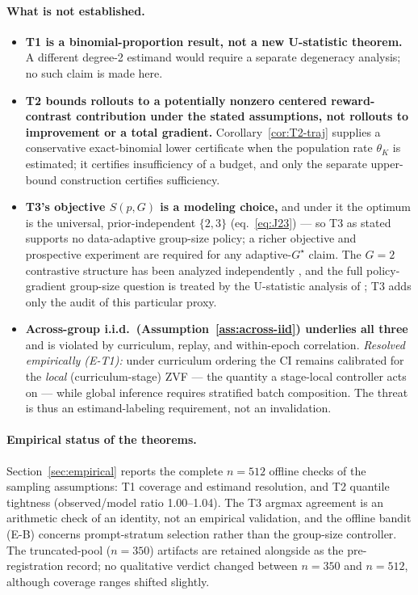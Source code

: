 \documentclass[11pt]{article}
\theoremstyle{plain}
\theoremstyle{definition}
\theoremstyle{remark}
\newcommand{\1}{\mathbb{1}}
\begin{document}
\paragraph{What is not established.}
\begin{itemize}[leftmargin=1.5em,itemsep=1pt]
  \item \textbf{T1 is a binomial-proportion result, not a new U-statistic
        theorem.} A different degree-2 estimand would require a separate
        degeneracy analysis; no such claim is made here.
  \item \textbf{T2 bounds rollouts to a potentially nonzero centered
        reward-contrast contribution under the stated assumptions, not
        rollouts to improvement or a total gradient.}
        Corollary~\ref{cor:T2-traj} supplies a conservative exact-binomial
        lower certificate when the population rate $\theta_K$ is estimated;
        it certifies insufficiency of a budget, and only the separate
        upper-bound construction certifies sufficiency.
  \item \textbf{T3's objective $S(p,G)$ is a modeling choice,} and under it
        the optimum is the universal, prior-independent $\{2,3\}$
        (eq.~\ref{eq:J23}) --- so T3 as stated supports no data-adaptive
        group-size policy; a richer objective and prospective experiment are
        required for any adaptive-$G^\star$ claim. The $G{=}2$ contrastive
        structure has been analyzed independently \cite{wu2025grpodpo}, and
        the full policy-gradient group-size question is treated by the
        U-statistic analysis of \citet{zhou2026demystifyinggrpo}; T3 adds
        only the audit of this particular proxy.
  \item \textbf{Across-group i.i.d.\ (Assumption~\ref{ass:across-iid})
        underlies all three} and is violated by curriculum, replay, and
        within-epoch correlation. \emph{Resolved empirically (E-T1):} under
        curriculum ordering the CI remains calibrated for the \emph{local}
        (curriculum-stage) ZVF --- the quantity a stage-local controller
        acts on --- while global inference requires stratified batch
        composition. The threat is thus an estimand-labeling requirement,
        not an invalidation.
\end{itemize}

\paragraph{Empirical status of the theorems.} Section~\ref{sec:empirical}
reports the complete $n{=}512$ offline checks of the sampling assumptions: T1
coverage and estimand resolution, and T2 quantile tightness (observed/model
ratio 1.00--1.04). The T3 argmax agreement is an arithmetic check of an
identity, not an empirical validation, and the offline bandit (E-B) concerns
prompt-stratum selection rather than the group-size controller. The
truncated-pool ($n{=}350$) artifacts are retained alongside as the
pre-registration record; no qualitative verdict changed between $n{=}350$ and
$n{=}512$, although coverage ranges shifted slightly.
\end{document}
